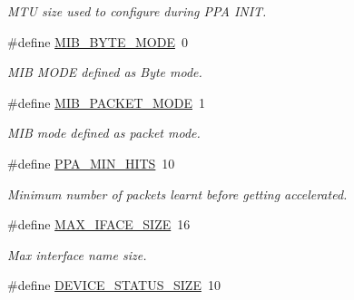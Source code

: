 \begin{DoxyCompactItemize}
\begin{DoxyCompactList}\small\item\em M\-T\-U size used to configure during P\-P\-A I\-N\-I\-T. \end{DoxyCompactList}\item 
\hypertarget{group__FAPI__SYSTEM_gae16af989292c7e8409b36a5fca285aca}{\#define \hyperlink{group__FAPI__SYSTEM_gae16af989292c7e8409b36a5fca285aca}{M\-I\-B\-\_\-\-B\-Y\-T\-E\-\_\-\-M\-O\-D\-E}~0}\label{group__FAPI__SYSTEM_gae16af989292c7e8409b36a5fca285aca}

\begin{DoxyCompactList}\small\item\em M\-I\-B M\-O\-D\-E defined as Byte mode. \end{DoxyCompactList}\item 
\hypertarget{group__FAPI__SYSTEM_gab5dbe3a46a83ad64e689558f555ad17e}{\#define \hyperlink{group__FAPI__SYSTEM_gab5dbe3a46a83ad64e689558f555ad17e}{M\-I\-B\-\_\-\-P\-A\-C\-K\-E\-T\-\_\-\-M\-O\-D\-E}~1}\label{group__FAPI__SYSTEM_gab5dbe3a46a83ad64e689558f555ad17e}

\begin{DoxyCompactList}\small\item\em M\-I\-B mode defined as packet mode. \end{DoxyCompactList}\item 
\hypertarget{group__FAPI__SYSTEM_gad3cc1083fdd9c66e0d4689fa138e227d}{\#define \hyperlink{group__FAPI__SYSTEM_gad3cc1083fdd9c66e0d4689fa138e227d}{P\-P\-A\-\_\-\-M\-I\-N\-\_\-\-H\-I\-T\-S}~10}\label{group__FAPI__SYSTEM_gad3cc1083fdd9c66e0d4689fa138e227d}

\begin{DoxyCompactList}\small\item\em Minimum number of packets learnt before getting accelerated. \end{DoxyCompactList}\item 
\hypertarget{group__FAPI__SYSTEM_ga3b43d117789877ed21d66d64a3aa5f58}{\#define \hyperlink{group__FAPI__SYSTEM_ga3b43d117789877ed21d66d64a3aa5f58}{M\-A\-X\-\_\-\-I\-F\-A\-C\-E\-\_\-\-S\-I\-Z\-E}~16}\label{group__FAPI__SYSTEM_ga3b43d117789877ed21d66d64a3aa5f58}

\begin{DoxyCompactList}\small\item\em Max interface name size. \end{DoxyCompactList}\item 
\hypertarget{group__FAPI__SYSTEM_gad4352d1c2c9fb3973ea187b6e76caf06}{\#define \hyperlink{group__FAPI__SYSTEM_gad4352d1c2c9fb3973ea187b6e76caf06}{D\-E\-V\-I\-C\-E\-\_\-\-S\-T\-A\-T\-U\-S\-\_\-\-S\-I\-Z\-E}~10}\label{group__FAPI__SYSTEM_gad4352d1c2c9fb3973ea187b6e76caf06}


\end{DoxyCompactItemize}
